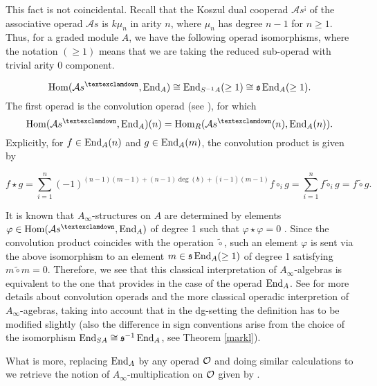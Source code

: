 \documentclass[join.tex]{subfiles}
\begin{document}
This fact is not coincidental. Recall that the Koszul dual cooperad $\mathcal{A}s^{¡}$ of the associative operad $\mathcal{A}s$ is $k\mu_n$ in arity $n$, where $\mu_n$ has degree $n-1$ for $n\geq 1$. Thus, for a graded module $A$, we have the following operad isomorphisms, where the notation $(\geq 1)$ means that we are taking the reduced sub-operad with trivial arity 0 component.


\[\Hom(\mathcal{A}s^{¡},\End_A)\cong \End_{S^{-1}A}(\geq 1)\cong\s\End_A(\geq 1).\]
The first operad is the convolution operad (see \cite[\S 6.4.1]{lodayvallette}), for which \[\Hom(\mathcal{A}s^{¡},\End_A)(n)=\Hom_R(\mathcal{A}s^{¡}(n),\End_A(n)).\] Explicitly, for $f\in\operatorname{End}_A(n)$ and $g\in\operatorname{End}_A(m)$, the convolution product is given by

\[f\star g=\sum_{i=1}^n(-1)^{(n-1)(m-1)+(n-1)\deg(b)+(i-1)(m-1)}f\circ_i g=\sum_{i=1}^nf\tilde{\circ}_i g=f\tilde{\circ}g.\]

It is known that $A_\infty$-structures on $A$ are determined by elements $\varphi\in\Hom(\mathcal{A}s^{¡},\End_A)$ of degree 1 such that $\varphi\star \varphi=0$ \cite[Proposition 10.1.3]{lodayvallette}. Since the convolution product coincides with the operation $\tilde{\circ}$, such an element $\varphi$ is sent via the above isomorphism to an element $m\in\mathfrak{s}\operatorname{End}_A(\geq 1)$ of degree 1 satisfying $m\tilde{\circ}m=0$. Therefore, we see that this classical interpretation of $A_\infty$-algebras is equivalent to the one that   provides in the case of the operad $\operatorname{End}_A$. See \cite[Proposition 10.1.11]{lodayvallette} for more details about convolution operads and the more classical operadic interpretion of $A_\infty$-agebras,  taking into account that in the dg-setting the definition has to be modified slightly (also the difference in sign conventions arise from the choice of the isomorphism $\operatorname{End}_{SA}\cong\mathfrak{s}^{-1}\operatorname{End}_A$, see Theorem \ref{markl}).

What is more, replacing $\operatorname{End}_A$ by any operad ${\mathcal O}$ and doing similar calculations to \cite[Proposition 10.1.11]{lodayvallette} we retrieve the notion of $A_\infty$-multiplication on ${\mathcal O}$ given by .%
\end{document}
